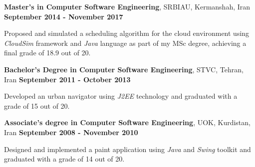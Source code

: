 
\begin{scholarship}
\scholarshipentry{}
{\textbf{Master's in Computer Software Engineering}, SRBIAU, Kermanshah, Iran \hspace{63 pt } \textbf{September 2014 - November 2017}

Proposed and simulated a scheduling algorithm for the cloud environment using \textit{CloudSim} framework and \textit{Java} language as part of my MSc degree, achieving a final grade of 18.9 out of 20. \vspace{5 pt}
}
\scholarshipentry{}
				{\textbf{Bachelor's Degree in Computer Software Engineering}, STVC, Tehran, Iran \hspace{69 pt} \textbf{September 2011 - October 2013}
 
Developed an urban navigator using \textit{J2EE} technology and graduated with a grade of 15 out of 20. \vspace{5 pt}	
}		
\scholarshipentry{}
				{\textbf{Associate's degree in Computer Software Engineering}, UOK, Kurdistan, Iran \hspace{50 pt} \textbf{September 2008 - November 2010}
 
Designed and implemented a paint application using \textit{Java} and \textit{Swing} toolkit and graduated with a grade of 14 out of 20.
}
\end{scholarship}
